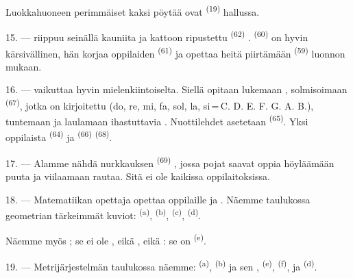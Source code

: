 Luokkahuoneen perimmäiset kaksi pöytää ovat 
\textsuperscript{(19)} hallussa.

\VUsaut{4.6mm}
\VUsaut{3.4mm}

15. ---  riippuu seinällä kauniita  ja
kattoon ripustettu  \textsuperscript{(62)}
.  \textsuperscript{(60)} on hyvin
kärsivällinen, hän korjaa oppilaiden 
\textsuperscript{(61)} ja opettaa heitä piirtämään 
\textsuperscript{(59)} luonnon mukaan.

16. ---  vaikuttaa hyvin mielenkiintoiselta. Siellä opitaan
lukemaan , solmisoimaan 
\textsuperscript{(67)}, jotka on kirjoitettu  (do, re,
mi, fa, sol, la, si\,=\,C. D. E. F. G. A. B.), tuntemaan
 ja laulamaan ihastuttavia .
Nuottilehdet asetetaan  \textsuperscript{(65)}. Yksi
oppilaista  \textsuperscript{(64)} ja
 \textsuperscript{(66)} 
\textsuperscript{(68)}.

17. --- Alamme nähdä nurkkauksen  \textsuperscript{(69)}
, jossa pojat saavat oppia höyläämään puuta ja viilaamaan
rautaa. Sitä ei ole kaikissa oppilaitoksissa.

\VUsaut{5.0mm}
\VUsaut{3.6mm}

18. --- Matematiikan opettaja opettaa oppilaille  ja . Näemme taulukossa
geometrian tärkeimmät kuviot:  \textsuperscript{(a)},
 \textsuperscript{(b)}, 
\textsuperscript{(c)},  \textsuperscript{(d)}.

Näemme myös ; se ei ole , eikä
, eikä : se on 
\textsuperscript{(e)}.

19. --- Metrijärjestelmän taulukossa näemme: 
\textsuperscript{(a)},  \textsuperscript{(b)} ja sen
,  \textsuperscript{(e)},
 \textsuperscript{(f)},  ja
 \textsuperscript{(d)}.

